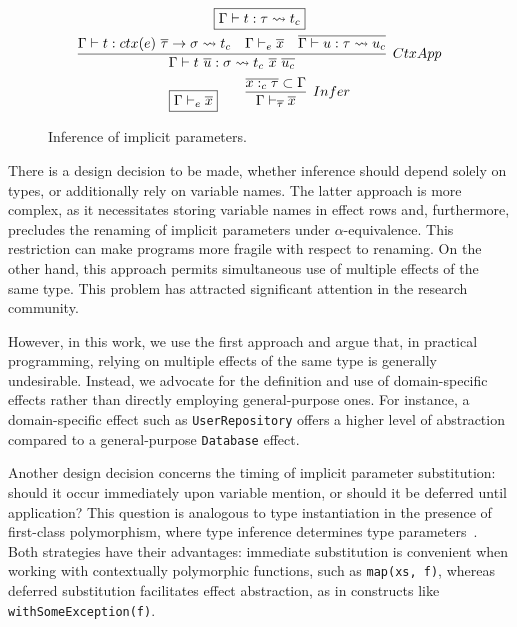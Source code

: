 \documentclass[acmsmall,review,screen]{acmart}
\newcommand{\mathframebox}[1]{\framebox{$\displaystyle #1$}}
\newcommand{\ap}{~}
\newcommand{\ctx}[1]{ctx(#1)~}
\newcommand{\step}{\rightsquigarrow}
\begin{document}
\begin{figure}
    \begin{gather*}
        \mathframebox{\Gamma\vdash t : \tau \step t_{c}} \\
        \infer[CtxApp]{
            \Gamma\vdash t\ap\overline{u} : \sigma \step t_{c} \ap \overline{x}\ap\overline{u_{c}}
        }{
            \Gamma\vdash t : \ctx{e} \overline{\tau} \to \sigma \step t_{c} &
            \Gamma\vdash_e\overline{x} &
            \overline{\Gamma\vdash u : \tau \step u_{c}}
        } \\
        \mathframebox{\Gamma\vdash_e \overline{x}}
        \text{\hspace{2em}}
        \infer[Infer]{\Gamma\vdash_{\overline{\tau}} \overline{x}}{\overline{x :_c \tau}\subset \Gamma}
    \end{gather*}
    \caption{Inference of implicit parameters.}
    \label{fig:core-im-core-implicit-inference}
\end{figure}

There is a design decision to be made, whether inference should depend solely on types, or additionally rely on variable names.
The latter approach is more complex, as it necessitates storing variable names in effect rows and, furthermore, precludes the renaming of implicit parameters under $\alpha$-equivalence.
This restriction can make programs more fragile with respect to renaming.
On the other hand, this approach permits simultaneous use of multiple effects of the same type.
This problem has attracted significant attention in the research community. %

However, in this work, we use the first approach and argue that, in practical programming, relying on multiple effects of the same type is generally undesirable.
Instead, we advocate for the definition and use of domain-specific effects rather than directly employing general-purpose ones.
For instance, a domain-specific effect such as \texttt{UserRepository} offers a higher level of abstraction compared to a general-purpose \texttt{Database} effect.

Another design decision concerns the timing of implicit parameter substitution: should it occur immediately upon variable mention, or should it be deferred until application?
This question is analogous to type instantiation in the presence of first-class polymorphism, where type inference determines type parameters~\cite{emrich2020freezeml}. %
Both strategies have their advantages: immediate substitution is convenient when working with contextually polymorphic functions, such as \texttt{map(xs, f)}, whereas deferred substitution facilitates effect abstraction, as in constructs like \texttt{withSomeException(f)}. %
\end{document}
